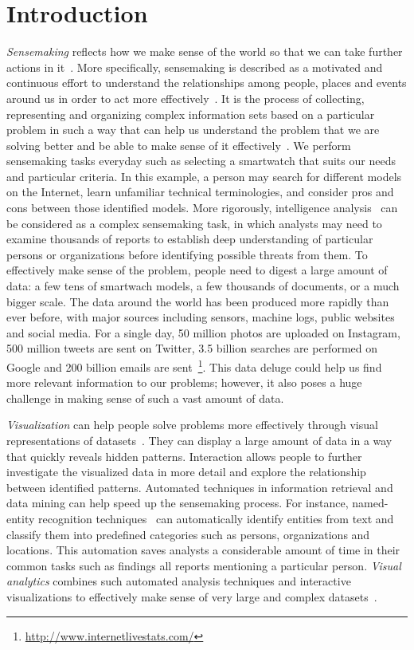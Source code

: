 \chapter{Introduction}
\label{chap:intro}

\graphicspath{{Chapter1/figures/}}

\emph{Sensemaking} reflects how we make sense of the world so that we can take further actions in it~\cite{Snowden2005}. More specifically, sensemaking is described as a motivated and continuous effort to understand the relationships among people, places and events around us in order to act more effectively~\cite{Klein2006a}. It is the process of collecting, representing and organizing complex information sets based on a particular problem in such a way that can help us understand the problem that we are solving better and be able to make sense of it effectively~\cite{Russell2008}. We perform sensemaking tasks everyday such as selecting a smartwatch that suits our needs and particular criteria. In this example, a person may search for different models on the Internet, learn unfamiliar technical terminologies, and consider pros and cons between those identified models. More rigorously, intelligence analysis~\cite{Heuer1999} can be considered as a complex sensemaking task, in which analysts may need to examine thousands of reports to establish deep understanding of particular persons or organizations before identifying possible threats from them. To effectively make sense of the problem, people need to digest a large amount of data: a few tens of smartwach models, a few thousands of documents, or a much bigger scale. The data around the world has been produced more rapidly than ever before, with major sources including sensors, machine logs, public websites and social media. For a single day, 50 million photos are uploaded on Instagram, 500 million tweets are sent on Twitter, 3.5 billion searches are performed on Google and 200 billion emails are sent~\footnote{\url{http://www.internetlivestats.com/}}. This data deluge could help us find more relevant information to our problems; however, it also poses a huge challenge in making sense of such a vast amount of data.

\emph{Visualization} can help people solve problems more effectively through visual representations of datasets~\cite{Munzner2014}. They can display a large amount of data in a way that quickly reveals hidden patterns. Interaction allows people to further investigate the visualized data in more detail and explore the relationship between identified patterns. Automated techniques in information retrieval and data mining can help speed up the sensemaking process. For instance, named-entity recognition techniques~\cite{Nadeau2007} can automatically identify entities from text and classify them into predefined categories such as persons, organizations and locations. This automation saves analysts a considerable amount of time in their common tasks such as findings all reports mentioning a particular person. \emph{Visual analytics} combines such automated analysis techniques and interactive visualizations to effectively make sense of very large and complex datasets~\cite{Keim2010}.

